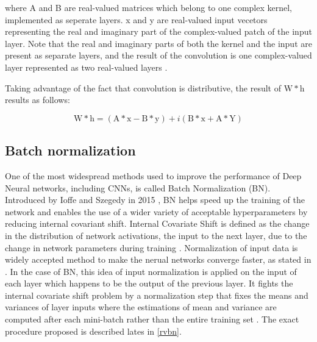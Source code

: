 where A and B are real-valued matrices which belong to one complex kernel, implemented as seperate layers. x and y are real-valued input vecetors  representing the real and imaginary part of the complex-valued patch of the input layer. Note that the real and imaginary parts of both the kernel and the input are present as separate layers, and the result of the convolution is one complex-valued layer represented as two real-valued layers \cite{Guberman}. 

Taking advantage of the fact that convolution is distributive, the result of $\mathrm{W*h}$ results as follows:

 \begin{equation}
\mathrm{W*h} = (\mathrm{A*x-B*y})+i(\mathrm{B*x+A*Y})
\label{eqCconv}
\end{equation}


 \subsection{Batch normalization}\label{ssec:bn}
One of the most widespread methods used to improve the performance of Deep Neural networks, including CNNs, is called Batch Normalization (BN). 
Introduced by Ioffe and Szegedy in 2015 \cite{bnIoffeS15}, BN helps speed up the training of the network and enables the use of a wider variety of acceptable hyperparameters by reducing internal covariant shift. 
Internal Covariate Shift is defined as the change in the distribution of network activations, the input to the next layer, due to the change in network parameters during training \cite{bnIoffeS15}. Normalization of input data is widely accepted method to make the nerual networks converge faster, as stated in \cite{LeCun1998}. In the case of BN, this idea of input normalization is applied on the input of each layer which happens to be the output of the previous layer. It fights the internal covariate shift problem by a normalization step that fixes the means and variances of layer inputs where the estimations of mean and variance are computed
after each mini-batch rather than the entire training set \cite{recent_advances}. The exact procedure proposed is described lates in \ref{rvbn}.

